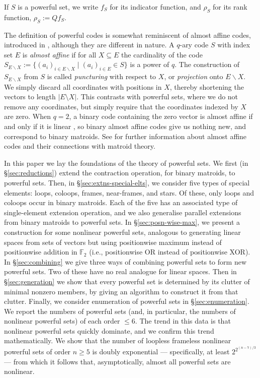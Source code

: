 \documentclass[12pt]{article}
\begin{document}
If $S$ is a powerful set, we write $f_S$ for its indicator function, and $\rho_S$ for its
rank function, $\rho_S:=Qf_S$.

The definition of powerful codes is somewhat reminiscent of almost affine codes,
introduced in \cite{simonis-ashikhmin98}, although they are different in nature.
A $q$-ary code $S$ with index set $E$
is \textit{almost affine} if for all $X\subseteq E$ the cardinality of the code
$S_{E\backslash X} := \{(a_i)_{i\in E\backslash X}\mid (a_i)_{i\in E}\in S\}$ is a power of $q$.
The construction of $S_{E\backslash X}$ from $S$ is called \textit{puncturing}
with respect to $X$, or \textit{projection} onto $E\backslash X$.  We
simply discard all coordinates with positions in $X$, thereby shortening the vectors
to length $|E\setminus X|$.  This contrasts with powerful sets, where we do not remove
any coordinates, but simply require that the coordinates indexed by $X$ are zero.
When $q=2$, a binary code containing the zero vector is almost affine if and only if
it is linear \cite{simonis-ashikhmin98}, so binary almost affine codes give us nothing new,
and correspond to binary matroids.
See \cite{simonis-ashikhmin98,westerbaeck-etal2016} for further information
about almost affine codes and their connections with matroid theory.

In this paper we lay the foundations of the theory of powerful sets. We first
(in \S\ref{sec:reductions}) extend the contraction operation, for binary matroids,
to powerful sets.  Then, in \S\ref{sec:extns-special-elts}, we consider five types of
special elements: loops, coloops, frames, near-frames, and stars.  Of these, only loops
and coloops occur in binary matroids.  Each of the five has an associated type of
single-element extension operation, and we also generalise parallel extensions from binary
matroids to powerful sets. In \S\ref{sec:posn-wise-max}, we present a construction for some
nonlinear powerful sets, analogous to generating linear spaces from sets of vectors but using
positionwise maximum instead of positionwise addition in $\mathbb{F}_2$ (i.e., positionwise OR instead of
positionwise XOR). In \S\ref{sec:combining} we give three ways of combining powerful sets to
form new powerful sets.  Two of these have no real analogue for linear spaces.
Then in \S\ref{sec:generation} we show that every powerful set is determined by its clutter
of minimal nonzero members, by giving an algorithm to construct it from that clutter.
Finally, we consider enumeration of powerful sets in \S\ref{sec:enumeration}.  We report
the numbers of powerful sets (and, in particular, the numbers of nonlinear powerful sets)
of each order $\le6$.  The trend in this data is that nonlinear powerful sets quickly dominate,
and we confirm this trend mathematically.  We show that the number of loopless frameless
nonlinear powerful sets of order $n\ge5$ is
doubly exponential --- specifically, at least $2^{2^{(n-7)/3}}$ --- from which it follows that,
asymptotically, almost all powerful sets are nonlinear.
\end{document}
